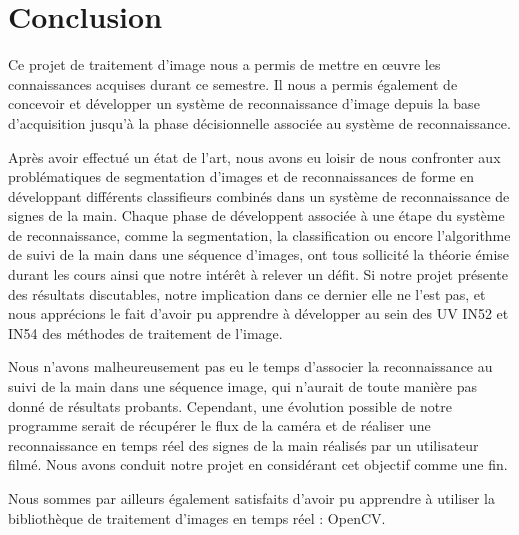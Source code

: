 \section*{Conclusion}
Ce projet de traitement d’image nous a permis de mettre en œuvre les connaissances acquises durant ce semestre. Il nous a permis également de concevoir et développer un système de reconnaissance d’image depuis la base d’acquisition jusqu'à la phase décisionnelle associée au système de reconnaissance. 

Après avoir effectué un état de l’art, nous avons eu loisir de nous confronter aux problématiques de segmentation d’images et de reconnaissances de forme en développant différents classifieurs combinés dans un système de reconnaissance de signes de la main. Chaque phase de développent associée à une étape du système de reconnaissance, comme la segmentation, la classification ou encore l’algorithme de suivi de la main dans une séquence d’images, ont tous sollicité la théorie émise durant les cours ainsi que notre intérêt à relever un défit. Si notre projet présente des résultats discutables, notre implication dans ce dernier elle ne l’est pas, et nous apprécions le fait d’avoir pu apprendre à développer au sein des UV IN52 et IN54 des méthodes de traitement de l’image.

Nous n’avons malheureusement pas eu le temps d’associer la reconnaissance au suivi de la main dans une séquence image, qui n’aurait de toute manière pas donné de résultats probants. Cependant, une évolution possible de notre programme serait de récupérer le flux de la caméra et de réaliser une reconnaissance en temps réel des signes de la main réalisés par un utilisateur filmé. Nous avons conduit notre projet en considérant cet objectif comme une fin.

Nous sommes par ailleurs également satisfaits d’avoir pu apprendre à utiliser la bibliothèque de traitement d’images en temps réel : OpenCV.

